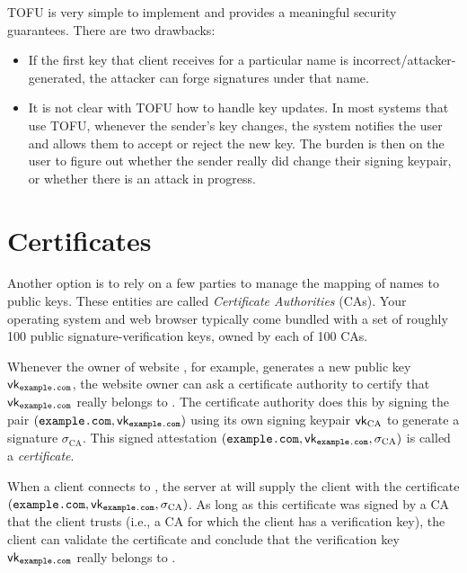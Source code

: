 TOFU is very simple to implement and provides a meaningful security
guarantees. 
There are two drawbacks:
\begin{itemize}
  \item If the first key that client receives for a particular name 
        is incorrect/attacker-generated, the attacker can forge signatures
        under that name.
  \item It is not clear with TOFU how to handle key updates. In most systems that use TOFU, whenever the sender's key changes, the system notifies the user and allows them to accept or reject the new key. The burden is then on the user to figure out whether the sender really did change their signing keypair, or whether there is an attack in progress.
\end{itemize}

\section{Certificates}
Another option is to rely on a few parties to
manage the mapping of names to public keys.
These entities are called \emph{Certificate Authorities} (CAs).
Your operating system and web browser typically come bundled with a
set of roughly 100 public signature-verification keys, owned by 
each of 100 CAs.

Whenever the owner of website , for example, generates 
a new public key $\vk_\ttt{example.com}$, the website owner can ask a 
certificate authority to certify that $\vk_\ttt{example.com}$ really belongs to .
The certificate authority does this by signing the
pair $(\ttt{example.com}, \vk_\ttt{example.com})$
using its own signing keypair $\mathsf{vk}_\text{CA}$
to generate a signature $\sigma_\text{CA}$.
This signed attestation $(\ttt{example.com},\allowbreak \vk_\ttt{example.com},\allowbreak \sigma_\text{CA})$
is called a \textit{certificate}.

When a client connects to , the server at 
will supply the client with the certificate $(\ttt{example.com},\allowbreak \vk_\ttt{example.com},\allowbreak\sigma_\text{CA})$.
As long as this certificate was signed by a CA that the client trusts (i.e., 
a CA for which the client has a verification key),
the client can validate the certificate and conclude that 
the verification key $\vk_\ttt{example.com}$ really belongs to .

